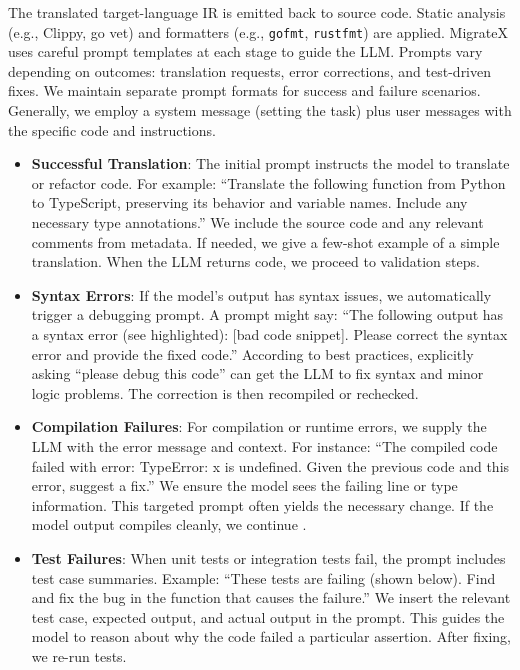 \documentclass[twocolumn]{article}
\begin{document}
The translated target-language IR is emitted back to source code. Static analysis (e.g., Clippy, go vet) and formatters (e.g., \texttt{gofmt}, \texttt{rustfmt}) are applied.
MigrateX uses careful prompt templates at each stage to guide the LLM. Prompts vary depending on outcomes: translation requests, error corrections, and test-driven fixes. We maintain separate prompt formats for success and failure scenarios. Generally, we employ a system message (setting the task) plus user messages with the specific code and instructions.

\begin{itemize}
    \item \textbf{Successful Translation}: The initial prompt instructs the model to translate or refactor code. For example: ``Translate the following function from Python to TypeScript, preserving its behavior and variable names. Include any necessary type annotations.'' We include the source code and any relevant comments from metadata. If needed, we give a few-shot example of a simple translation. When the LLM returns code, we proceed to validation steps.

    \item \textbf{Syntax Errors}: If the model’s output has syntax issues, we automatically trigger a debugging prompt. A prompt might say: ``The following output has a syntax error (see highlighted): [bad code snippet]. Please correct the syntax error and provide the fixed code.'' According to best practices, explicitly asking ``please debug this code'' can get the LLM to fix syntax and minor logic problems. The correction is then recompiled or rechecked.

    \item \textbf{Compilation Failures}: For compilation or runtime errors, we supply the LLM with the error message and context. For instance: ``The compiled code failed with error: TypeError: x is undefined. Given the previous code and this error, suggest a fix.'' We ensure the model sees the failing line or type information. This targeted prompt often yields the necessary change. If the model output compiles cleanly, we continue \cite{deligiannis2023fixing}.

    \item \textbf{Test Failures}: When unit tests or integration tests fail, the prompt includes test case summaries. Example: ``These tests are failing (shown below). Find and fix the bug in the function that causes the failure.'' We insert the relevant test case, expected output, and actual output in the prompt. This guides the model to reason about why the code failed a particular assertion. After fixing, we re-run tests.


\end{itemize}
\end{document}
